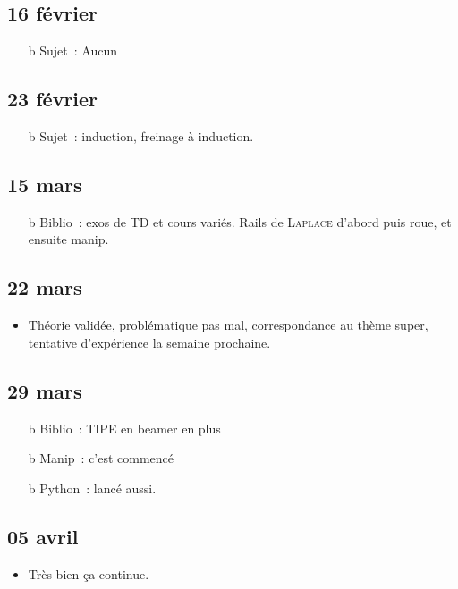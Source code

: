 \documentclass[a4paper, 11pt, final, garamond]{book}
\begin{document}
\subsection{16 février}
\begin{itemize}
	\item[b]{Sujet}~: Aucun
\end{itemize}

\subsection{23 février}
\begin{itemize}
	\item[b]{Sujet}~: induction, freinage à induction.
\end{itemize}

\subsection{15 mars}
\begin{itemize}
	\item[b]{Biblio}~: exos de TD et cours variés. Rails de \textsc{Laplace} d'abord
	puis roue, et ensuite manip.
\end{itemize}

\subsection{22 mars}
\begin{itemize}
	\item Théorie validée, problématique pas mal, correspondance au thème super,
	      tentative d'expérience la semaine prochaine.
\end{itemize}

\subsection{29 mars}
\begin{itemize}
	\item[b]{Biblio}~: TIPE en beamer en plus
	\item[b]{Manip}~: c'est commencé
	\item[b]{Python}~: lancé aussi.
\end{itemize}

\subsection{05 avril}
\begin{itemize}
	\item Très bien ça continue.
\end{itemize}
\end{document}
